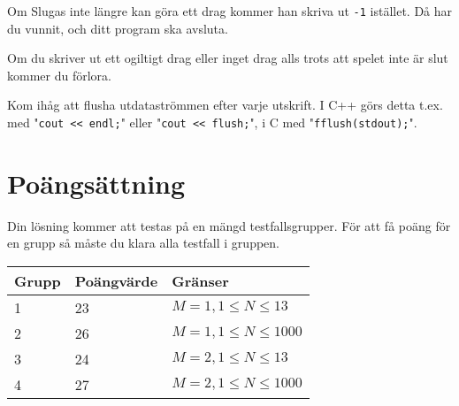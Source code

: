 Om Slugas inte längre kan göra ett drag kommer han skriva ut \texttt{-1} istället. Då har du vunnit, och ditt program ska avsluta.

Om du skriver ut ett ogiltigt drag eller inget drag alls trots att spelet inte är slut kommer du förlora.

Kom ihåg att flusha utdataströmmen efter varje utskrift. I C++ görs detta t.ex. med "\texttt{cout << endl;}" eller "\texttt{cout << flush;}", i C med "\texttt{fflush(stdout);}".

\section*{Poängsättning}
Din lösning kommer att testas på en mängd testfallsgrupper. För att få poäng för en grupp så måste du klara alla testfall i gruppen.

\noindent
\begin{tabular}{| l | l | l |}
\hline
Grupp & Poängvärde & Gränser\\ \hline
1     & 23         & $ M=1, 1 \le N \le 13 $ \\ \hline
2     & 26         & $ M=1, 1 \le N \le 1000 $ \\ \hline
3     & 24         & $ M=2, 1 \le N \le 13 $ \\ \hline
4     & 27         & $ M=2, 1 \le N \le 1000 $ \\ \hline
\end{tabular}
